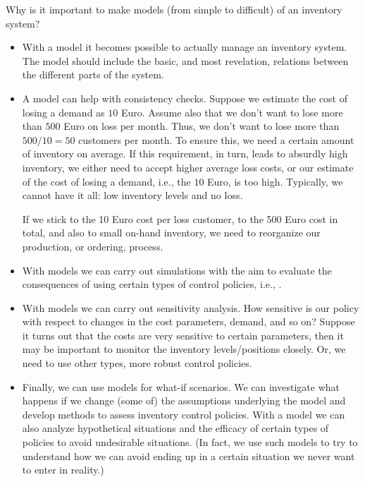 \begin{exercise}
Why is it important to make  models (from simple to difficult) of an inventory system?  
  \begin{solution}
    \begin{itemize}
    \item With a model it becomes possible to actually manage an
      inventory system. The model should include the basic, and most
      revelation, relations between the different parts of the system.
    \item A model can help with consistency checks. Suppose we estimate the cost of losing a demand as $10$ Euro. Assume also that we don't want to lose more than  $500$ Euro on loss per month. Thus, we don't want to lose more than $500/10=50$ customers per month. To ensure this, we need a certain amount of inventory on average. If this requirement, in turn, leads to absurdly high inventory, we either need to accept higher average loss costs, or our estimate of the cost of losing a demand, i.e., the $10$ Euro, is too high.  Typically, we cannot have it all: low inventory levels and no loss.

If we stick to the 10 Euro cost per loss customer, to the 500 Euro cost in total, and also to small on-hand inventory, we need to reorganize our production, or ordering, process.
    \item With models we can carry out simulations with the aim to
      evaluate the consequences of using certain types of control
      policies, i.e., .
    \item With models we can carry out sensitivity analysis. How
      sensitive is our policy with respect to changes in the cost
      parameters, demand, and so on? Suppose it turns out that the
      costs are very sensitive to certain parameters, then it may be important to monitor the
      inventory levels/positions closely. Or, we need to use other types, more robust control policies.
    \item Finally, we can use models for what-if scenarios.  We can
      investigate what happens if we change (some of) the assumptions
      underlying the model and develop methods to assess inventory
      control policies. With a model we can also analyze hypothetical
      situations and the efficacy of certain types of policies to
      avoid undesirable situations. (In fact, we use such models to
      try to understand how we can avoid ending up in a certain
      situation we never want to enter in reality.)
    \end{itemize}
  \end{solution}
\end{exercise}






